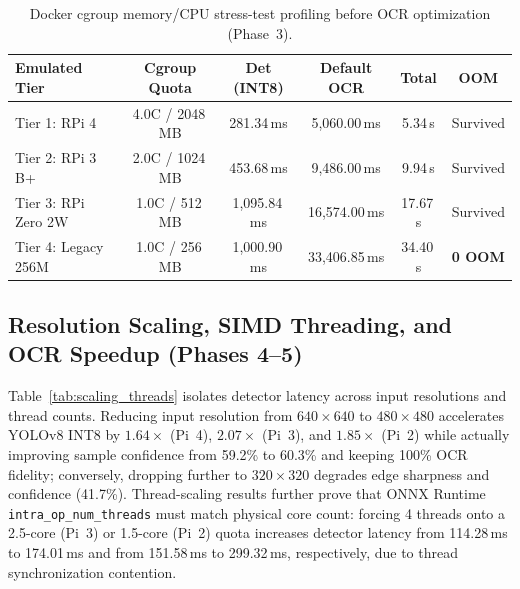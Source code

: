 \documentclass[pdflatex,sn-mathphys-num]{sn-jnl}
\begin{document}
\begin{table}[t]
\centering
\caption{Docker cgroup memory/CPU stress-test profiling before OCR optimization (Phase~3).}\label{tab:stress_test}
\footnotesize
\setlength{\tabcolsep}{4pt}
\begin{tabular}{@{}lccccc@{}}
\toprule
\textbf{Emulated Tier} & \textbf{Cgroup Quota} & \textbf{Det (INT8)} & \textbf{Default OCR} & \textbf{Total} & \textbf{OOM} \\
\midrule
Tier 1: RPi 4 & 4.0C / 2048\,MB & 281.34\,ms & 5,060.00\,ms & 5.34\,s & Survived \\
Tier 2: RPi 3 B+ & 2.0C / 1024\,MB & 453.68\,ms & 9,486.00\,ms & 9.94\,s & Survived \\
Tier 3: RPi Zero 2W & 1.0C / 512\,MB & 1,095.84\,ms & 16,574.00\,ms & 17.67\,s & Survived \\
Tier 4: Legacy 256M & 1.0C / 256\,MB & 1,000.90\,ms & 33,406.85\,ms & 34.40\,s & \textbf{0 OOM} \\
\bottomrule
\end{tabular}
\end{table}

\subsection{Resolution Scaling, SIMD Threading, and OCR Speedup (Phases 4--5)}\label{subsec:exp_speedup}
Table~\ref{tab:scaling_threads} isolates detector latency across input resolutions and thread counts. Reducing input resolution from $640\times 640$ to $480\times 480$ accelerates YOLOv8 INT8 by $1.64\times$ (Pi~4), $2.07\times$ (Pi~3), and $1.85\times$ (Pi~2) while actually improving sample confidence from 59.2\% to 60.3\% and keeping 100\% OCR fidelity; conversely, dropping further to $320\times 320$ degrades edge sharpness and confidence (41.7\%). Thread-scaling results further prove that ONNX Runtime \texttt{intra\_op\_num\_threads} must match physical core count: forcing 4 threads onto a 2.5-core (Pi~3) or 1.5-core (Pi~2) quota increases detector latency from 114.28\,ms to 174.01\,ms and from 151.58\,ms to 299.32\,ms, respectively, due to thread synchronization contention.
\end{document}
